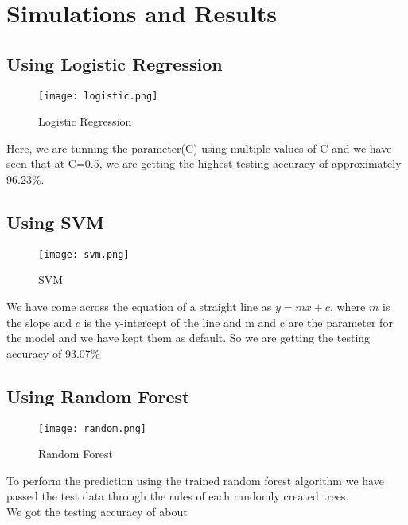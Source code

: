 \documentclass[12pt,a4paper]{report}
\begin{document}
\section{Simulations and Results}
\subsection{Using Logistic Regression}
\begin{figure}[!h]
	\begin{center}

		\texttt{[image: logistic.png]}
		\caption{Logistic Regression}
	\end{center}
\end{figure}
Here, we are tunning the parameter(C) using multiple values of C and we have seen that at C=0.5, we are getting the highest testing accuracy of approximately 96.23\%. \\
\subsection{Using SVM}
\begin{figure}[!h]
\begin{center}

		\texttt{[image: svm.png]}
		\caption{SVM}
\end{center}
\end{figure}
We have come across the equation of a straight line as \(y=mx+c\), where \(m\) is the slope and \(c\) is the y-intercept of the line and m and c are the parameter for the model and we have kept them as default. So we are getting the testing accuracy of 93.07\% \\
\newpage
\subsection{Using Random Forest}
\begin{figure}[h!]
	\begin{center}
	\texttt{[image: random.png]}
			\caption{Random Forest}	
	\end{center}
\end{figure}
To perform the prediction using the trained random forest algorithm we have passed the test data through the rules of each randomly created trees. \\
We got the testing accuracy of about 
\end{document}
